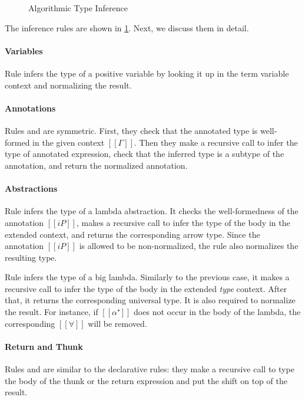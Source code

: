\begin{figure}
  \ottdefnATPInfLabeled{}
  \hfill \\
  \ottdefnATNInfLabeled{}
  \hfill \\
  \ottdefnATSpinInfLabeled{}
  \caption{Algorithmic Type Inference}
  \label{fig:type-inference}
\end{figure}


The inference rules are shown in
\cref{fig:type-inference}.
Next, we discuss them in detail.

\paragraph{Variables}
  Rule  
  infers the type of a positive variable by looking it up in the 
  term variable context and normalizing the result.

\paragraph{Annotations}
  Rules  and 
  are symmetric.
  First, they check that the annotated type is well-formed in the 
  given context $[[Γ]]$. Then they make a recursive call to infer the 
  type of annotated expression, check that the inferred type is a subtype of 
  the annotation, and return the normalized annotation.

\paragraph{Abstractions}
  Rule  infers the type of a lambda abstraction.
  It checks the well-formedness of the annotation $[[iP]]$,
  makes a recursive call to infer the type of the body in the extended context, 
  and returns the corresponding arrow type.
  Since the annotation $[[iP]]$ is allowed to be non-normalized,
  the rule also normalizes the resulting type.

  Rule  infers the type of a big lambda.
  Similarly to the previous case, it makes a recursive call to infer the type
  of the body in the extended \emph{type} context. 
  After that, it returns the corresponding universal type. 
  It is also required to normalize the result.  
  For instance, if $[[α⁺]]$ does not occur in the body of the lambda,
  the corresponding $[[∀]]$ will be removed.

\paragraph{Return and Thunk}
  Rules  and 
  are similar to the declarative rules: they make a recursive call
  to type the body of the thunk or the return expression and
  put the shift on top of the result.

